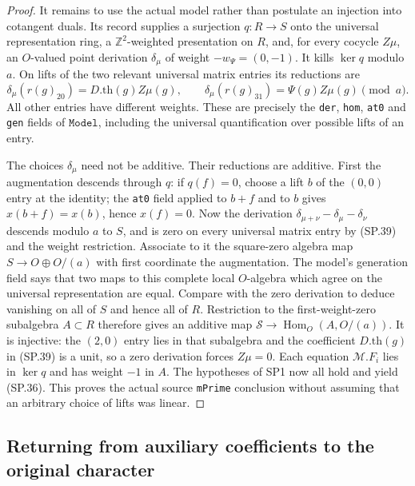 \begin{proof}
It remains to use the actual model rather than postulate an
injection into cotangent duals.  Its record supplies a surjection
$q:R\to S$ onto the universal representation ring, a
$\mathbb Z^2$-weighted presentation on $R$, and, for every cocycle
$Z\mu$, an $O$-valued point derivation $\delta_\mu$ of weight
$-w_\Psi=(0,-1)$.  It kills $\ker q$ modulo $a$.  On lifts of the
two relevant universal matrix entries its reductions are
\[
 \delta_\mu(r(g)_{20})=D.\mathrm{th}(g)Z\mu(g),\qquad
 \delta_\mu(r(g)_{31})=\Psi(g)Z\mu(g)
                         \pmod a.
 \tag{SP.39}
\]
All other entries have different weights.  These are precisely the
\texttt{der}, \texttt{hom}, \texttt{at0} and \texttt{gen} fields of
$\texttt{Model}$, including the universal quantification over
possible lifts of an entry.

The choices $\delta_\mu$ need not be additive.  Their reductions
are additive.  First the augmentation descends through $q$:
if $q(f)=0$, choose a lift $b$ of the $(0,0)$ entry at the identity;
the \texttt{at0} field applied to $b+f$ and to $b$ gives
$x(b+f)=x(b)$, hence $x(f)=0$.
Now the derivation
$\delta_{\mu+\nu}-\delta_\mu-\delta_\nu$ descends modulo $a$ to
$S$, and is zero on every universal matrix entry by (SP.39) and
the weight restriction.  Associate to it the square-zero algebra
map $S\to O\oplus O/(a)$ with first coordinate the augmentation.
The model's generation field says that two maps to this complete
local $O$-algebra which agree on the universal representation are
equal.  Compare with the zero derivation to deduce vanishing on
all of $S$ and hence all of $R$.
Restriction to the first-weight-zero subalgebra $A\subset R$
therefore gives an additive map
$\mathcal S\to\operatorname{Hom}_O(A,O/(a))$.
It is injective: the $(2,0)$ entry lies in that subalgebra and
the coefficient $D.\mathrm{th}(g)$ in (SP.39) is a unit, so a zero
derivation forces $Z\mu=0$.
Each equation $\mathcal M.F_i$ lies in $\ker q$ and has weight
$-1$ in $A$.  The hypotheses of SP1 now all hold and yield
(SP.36).  This proves the actual source \texttt{mPrime} conclusion
without assuming that an arbitrary choice of lifts was linear.
\end{proof}

\subsection{Returning from auxiliary coefficients to the original character}

